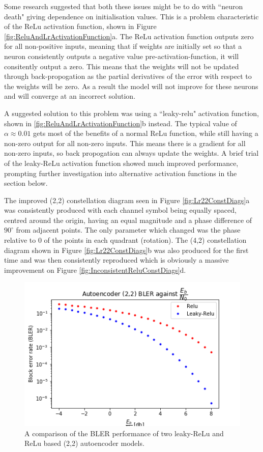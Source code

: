 \documentclass[12pt,onecolumn,letterpaper]{article}
\newcommand\genfigsize{0.5}
\begin{document}
Some research suggested that both these issues might be to do with ``neuron death" giving dependence on initialisation values. This is a problem characteristic of the ReLu activation function, shown in Figure \ref{fig:ReluAndLrActivationFunction}a. The ReLu activation function outputs zero for all non-positive inputs, meaning that if weights are initially set so that a neuron consistently outputs a negative value pre-activation-function, it will consitently output a zero. This means that the weights will not be updated through back-propogation as the partial derivatives of the error with respect to the weights will be zero. As a result the model will not improve for these neurons and will converge at an incorrect solution. 

A suggested solution to this problem was using a ``leaky-relu" activation function, shown in \ref{fig:ReluAndLrActivationFunction}b instead. The typical value of $\alpha\approx0.01$ gets most of the benefits of a normal ReLu function, while still having a non-zero output for all non-zero inputs. This means there is a gradient for all non-zero inputs, so back propogation can always update the weights. A brief trial of the leaky-ReLu activation function showed much improved performance, prompting further investigation into alternative activation functions in the section below. 

The improved (2,2) constellation diagram seen in Figure \ref{fig:Lr22ConstDiags}a was consistently produced with each channel symbol being equally spaced, centred around the origin, having an equal magnitude and a phase difference of $90^{\circ}$ from adjacent points. The only parameter which changed was the phase relative to 0 of the points in each quadrant (rotation). The (4,2) constellation diagram shown in Figure \ref{fig:Lr22ConstDiags}b was also produced for the first time and was then consistently reproduced which is obviously a massive improvement on Figure \ref{fig:InconsistentReluConstDiags}d.

\begin{figure}[t]
   \centering
   \includegraphics[width=\genfigsize\linewidth]{figures/autoencoder_2_2_bler_EbNo_leaky_vs_relu.png}
   \caption{A comparison of the BLER performance of two leaky-ReLu and ReLu based (2,2) autoencoder models.}
   \label{fig:ReluVsLrBlerAcrossSnrs}
\end{figure}
\end{document}
